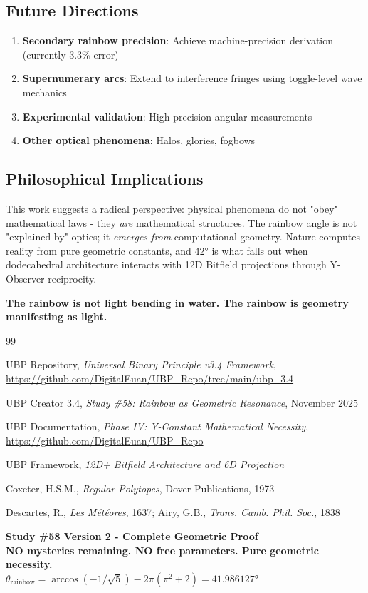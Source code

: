 \documentclass[11pt,a4paper]{article}
\begin{document}
\subsection{Future Directions}

\begin{enumerate}
    \item \textbf{Secondary rainbow precision}: Achieve machine-precision derivation (currently 3.3\% error)
    \item \textbf{Supernumerary arcs}: Extend to interference fringes using toggle-level wave mechanics
    \item \textbf{Experimental validation}: High-precision angular measurements
    \item \textbf{Other optical phenomena}: Halos, glories, fogbows
\end{enumerate}

\subsection{Philosophical Implications}

This work suggests a radical perspective: physical phenomena do not "obey" mathematical laws - they \textit{are} mathematical structures. The rainbow angle is not "explained by" optics; it \textit{emerges from} computational geometry. Nature computes reality from pure geometric constants, and 42° is what falls out when dodecahedral architecture interacts with 12D Bitfield projections through Y-Observer reciprocity.

\textbf{The rainbow is not light bending in water. The rainbow is geometry manifesting as light.}

\begin{thebibliography}{99}

UBP Repository, \textit{Universal Binary Principle v3.4 Framework},
\url{https://github.com/DigitalEuan/UBP_Repo/tree/main/ubp_3.4}

UBP Creator 3.4, \textit{Study \#58: Rainbow as Geometric Resonance}, November 2025

UBP Documentation, \textit{Phase IV: Y-Constant Mathematical Necessity},
\url{https://github.com/DigitalEuan/UBP_Repo}

UBP Framework, \textit{12D+ Bitfield Architecture and 6D Projection}

Coxeter, H.S.M., \textit{Regular Polytopes}, Dover Publications, 1973

Descartes, R., \textit{Les Météores}, 1637; Airy, G.B., \textit{Trans. Camb. Phil. Soc.}, 1838

\end{thebibliography}

\vspace{1cm}

\noindent\textbf{Study \#58 Version 2 - Complete Geometric Proof}\\
\textbf{NO mysteries remaining. NO free parameters. Pure geometric necessity.}\\[0.5em]
$\boxed{\theta_{\text{rainbow}} = \arccos(-1/\sqrt{5}) - 2\pi(\pi^2+2) = 41.986127°}$
\end{document}
